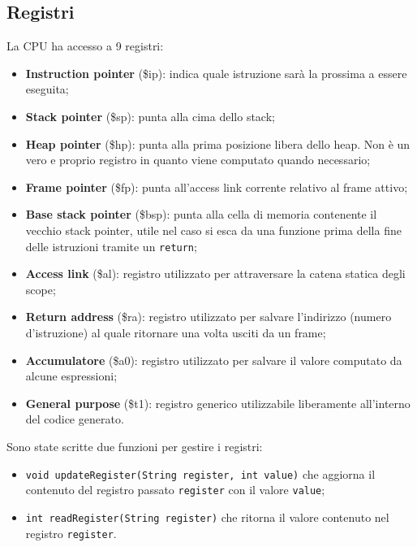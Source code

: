 \documentclass[../report.tex]{subfiles}
\begin{document}
\subsection{Registri}\label{ss:registri}
La CPU ha accesso a 9 registri:
\begin{itemize}
    \item \textbf{Instruction pointer} (\$ip): indica quale istruzione sarà la prossima a essere eseguita;
    \item \textbf{Stack pointer} (\$sp): punta alla cima dello stack;
    \item \textbf{Heap pointer} (\$hp): punta alla prima posizione libera dello heap. Non \`e un vero e proprio registro in quanto viene computato quando necessario;
    \item \textbf{Frame pointer} (\$fp): punta all'access link corrente relativo al frame attivo;
    \item \textbf{Base stack pointer} (\$bsp): punta alla cella di memoria contenente il vecchio stack pointer, utile nel caso si esca da una funzione prima della fine delle istruzioni tramite un \verb|return|;
    \item \textbf{Access link} (\$al): registro utilizzato per attraversare la catena statica degli scope;
    \item \textbf{Return address} (\$ra): registro utilizzato per salvare l'indirizzo (numero d'istruzione) al quale ritornare una volta usciti da un frame;
    \item \textbf{Accumulatore} (\$a0): registro utilizzato per salvare il valore computato da alcune espressioni;
    \item \textbf{General purpose} (\$t1): registro generico utilizzabile liberamente all'interno del codice generato.
\end{itemize}
Sono state scritte due funzioni per gestire i registri:
\begin{itemize}
    \item \verb|void updateRegister(String register, int value)| che aggiorna il contenuto del registro passato \verb|register| con il valore \verb|value|;
    \item \verb|int readRegister(String register)| che ritorna il valore contenuto nel registro \verb|register|.
\end{itemize}
\end{document}
